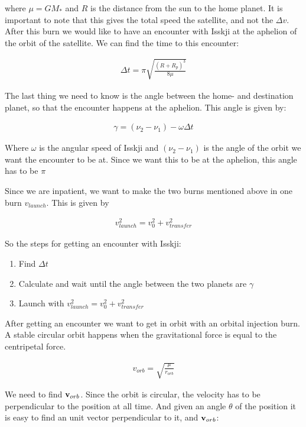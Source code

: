 \documentclass[a4paper, 10pt]{article}
\begin{document}
where $\mu = GM_*$ and $R$ is the distance from the sun to the home planet. It is important to note that this gives the total speed the satellite, and not the $\Delta v$. \\

After this burn we would like to have an encounter with Isskji at the aphelion of the orbit of the satellite. We can find the time to this encounter:

\begin{align}
\Delta t = \pi \sqrt{\frac{(R +R_p)^3}{8\mu}}
\end{align}

The last thing we need to know is the angle between the home- and destination planet, so that the encounter happens at the aphelion. This angle is given by:

\begin{align}
\gamma = (\nu_2 -\nu_1) - \omega \Delta t
\end{align}

Where $\omega$ is the angular speed of Isskji and $(\nu_2 -\nu_1)$ is the angle of the orbit we want the encounter to be at. Since we want this to be at the aphelion, this angle has to be $\pi$

Since we are inpatient, we want to make the two burns mentioned above in one burn $v_{launch}$. This is given by

\begin{align}
v_{launch}^2 = v_0^2 + v_{transfer}^2
\end{align} 

So the steps for getting an encounter with Isskji:

\begin{enumerate}
\item Find $\Delta t$
\item Calculate and wait until the angle between the two planets are $\gamma$
\item Launch with $v_{launch}^2 = v_0^2 + v_{transfer}^2$ 
\end{enumerate}

After getting an encounter we want to get in orbit with an orbital injection burn. A stable circular orbit happens when the gravitational force is equal to the centripetal force.

\begin{align}
v_{orb} = \sqrt{\frac{\mu}{r_{orb}}}
\end{align}

We need to find $\bold{v}_{orb}$. Since the orbit is circular, the velocity has to be perpendicular to the position at all time. And given an angle $\theta$ of the position it is easy to find an unit vector perpendicular to it, and $\bold{v}_{orb}$:
\end{document}
